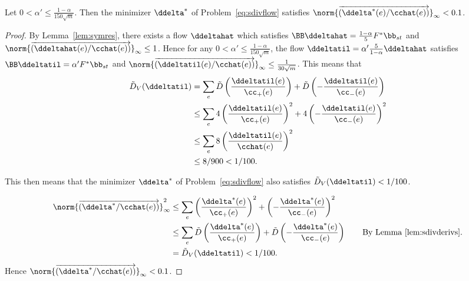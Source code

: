 \begin{lemma}
  Let $0 < \alpha' \leq \frac{1-\alpha}{150\sqrt{m}}$.
  Then the minimizer $\ddelta^*$ of Problem~\eqref{eq:sdivflow}
  satisfies $\norm{\cvec{\ddelta^*(e)/\cchat(e)}}_{\infty} < 0.1$.
\end{lemma}
\begin{proof}
  By Lemma~\ref{lem:symres}, there exists a flow $\ddeltahat$ which satisfies $\BB \ddeltahat = \frac{1-\alpha}{5}  F^*
   \bb_{st} $ and ${\norm{\cvec{\ddeltahat(e)/\cchat(e)}}_{\infty} \leq
   1}$.
 Hence for any
 $0 < \alpha' \leq \frac{1-\alpha}{150\sqrt{m}}$,
 the flow 
 $\ddeltatil = \alpha' \frac{5}{1-\alpha}\ddeltahat$
 satisfies
$\BB \ddeltatil = \alpha' F^*\bb_{st}$
and
$\norm{\cvec{\ddeltatil(e)/\cchat(e)}}_{\infty}
\leq
\frac{1}{30\sqrt{m}} $.
   This means that
\begin{align*}
     \sdiv_V( \ddeltatil )
     &=
    \sum_e
     \sdiv\left(\frac{\ddeltatil(e)}{\cc_+(e)}\right)
    +
    \sdiv\left(-\frac{\ddeltatil(e)}{\cc_-(e)}\right)
  \\
  &\leq
    \sum_e
     4\left(\frac{\ddeltatil(e)}{\cc_+(e)}\right)^2
    +
    4\left(-\frac{\ddeltatil(e)}{\cc_-(e)}\right)^2
  \\
  &
  \leq
    \sum_e
    8\left(\frac{\ddeltatil(e)}{\cchat
        (e)}\right)^2
 \\
     &\leq 8/900 < 1/100
.
\end{align*}

This then means that the minimizer $\ddelta^*$ of
Problem~\eqref{eq:sdivflow} also satisfies
$\sdiv_V( \ddeltatil ) < 1/100$.

\begin{align*}
  \norm{\cvec{\ddelta^*/\cchat(e)}}_{\infty}^2
&\leq 
      \sum_e
     \left(\frac{\ddelta^*(e)}{\cc_+(e)}\right)^2
    +
    \left(-\frac{\ddelta^*(e)}{\cc_-(e)}\right)^2
\\                                      
&\leq 
    \sum_e
     \sdiv\left(\frac{\ddelta^*(e)}{\cc_+(e)}\right)
    +
    \sdiv\left(-\frac{\ddelta^*(e)}{\cc_-(e)}\right)
\tag*{By Lemma~\ref{lem:sdivderivs}.}
\\
  &=
\sdiv_V( \ddeltatil ) 
<
1/100
.
\end{align*}
Hence $\norm{\cvec{\ddelta^*/\cchat(e)}}_{\infty} < 0.1$.
\end{proof}


 
